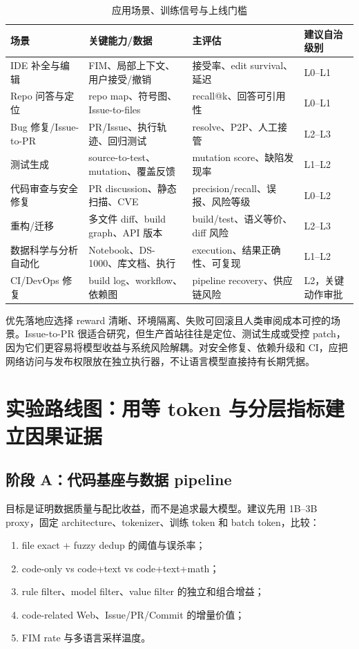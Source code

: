 \documentclass[10pt,a4paper,UTF8,fontset=none]{ctexart}
\begin{document}
\begin{table}[htbp]
\centering
\caption{应用场景、训练信号与上线门槛}
\label{zh:tab:applications}
\small
\begin{tabularx}{\textwidth}{p{3.0cm}YYY}
\toprule
场景 & 关键能力/数据 & 主评估 & 建议自治级别 \\
\midrule
IDE 补全与编辑 & FIM、局部上下文、用户接受/撤销 & 接受率、edit survival、延迟 & L0--L1 \\
Repo 问答与定位 & repo map、符号图、Issue-to-files & recall@k、回答可引用性 & L0--L1 \\
Bug 修复/Issue-to-PR & PR/Issue、执行轨迹、回归测试 & resolve、P2P、人工接管 & L2--L3 \\
测试生成 & source-to-test、mutation、覆盖反馈 & mutation score、缺陷发现率 & L1--L2 \\
代码审查与安全修复 & PR discussion、静态扫描、CVE & precision/recall、误报、风险等级 & L0--L2 \\
重构/迁移 & 多文件 diff、build graph、API 版本 & build/test、语义等价、diff 风险 & L2--L3 \\
数据科学与分析自动化 & Notebook、DS-1000、库文档、执行 & execution、结果正确性、可复现 & L1--L2 \\
CI/DevOps 修复 & build log、workflow、依赖图 & pipeline recovery、供应链风险 & L2，关键动作审批 \\
\bottomrule
\end{tabularx}
\end{table}

优先落地应选择 reward 清晰、环境隔离、失败可回滚且人类审阅成本可控的场景。Issue-to-PR 很适合研究，但生产首站往往是定位、测试生成或受控 patch，因为它们更容易将模型收益与系统风险解耦。对安全修复、依赖升级和 CI，应把网络访问与发布权限放在独立执行器，不让语言模型直接持有长期凭据。

\section{实验路线图：用等 token 与分层指标建立因果证据}

\subsection{阶段 A：代码基座与数据 pipeline}

目标是证明数据质量与配比收益，而不是追求最大模型。建议先用 1B--3B proxy，固定 architecture、tokenizer、训练 token 和 batch token，比较：

\begin{enumerate}
  \item file exact + fuzzy dedup 的阈值与误杀率；
  \item code-only vs code+text vs code+text+math；
  \item rule filter、model filter、value filter 的独立和组合增益；
  \item code-related Web、Issue/PR/Commit 的增量价值；
  \item FIM rate 与多语言采样温度。
\end{enumerate}
\end{document}
